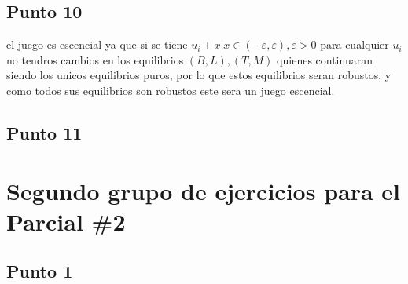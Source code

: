 \documentclass[11pt]{article}
\begin{document}
\subsection{Punto 10}

\begin{flushleft}
    el juego es escencial ya que si se tiene $u_i+x|x\in(-\varepsilon,\varepsilon),\varepsilon>0$ para cualquier $u_i$
    no tendros cambios en los equilibrios $(B,L),(T,M)$ quienes continuaran siendo los unicos equilibrios puros, por lo que
    estos equilibrios seran robustos, y como todos sus equilibrios son robustos este sera un juego escencial.
\end{flushleft}

\subsection{Punto 11}

\section{Segundo grupo de ejercicios para el Parcial \#2}
\subsection{Punto 1}
\begin{flushleft}
\end{flushleft}
\end{document}
